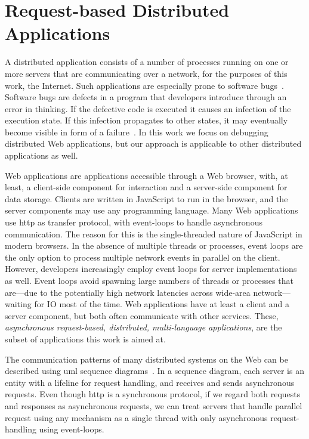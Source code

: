 \chapter{Request-based Distributed Applications}
\label{sec:requ-based-distr}

A distributed application consists of a number of processes running on
one or more servers that are communicating over a network, for the
purposes of this work, the Internet. Such applications are especially
prone to software bugs~\cite{Ballou2008}. Software bugs are defects in
a program that developers introduce through an error in thinking. If
the defective code is executed it causes an infection of the execution
state. If this infection propagates to other states, it may eventually
become visible in form of a failure~\cite{zeller2009programs}. In this
work we focus on debugging distributed Web applications, but our
approach is applicable to other distributed applications as well.

Web applications are applications accessible through a Web browser,
with, at least, a client-side component for interaction and a
server-side component for data storage. Clients are written in
JavaScript to run in the browser, and the server components may use
any programming language. Many Web applications use \ac{http} as
transfer protocol, with event-loops to handle asynchronous
communication. The reason for this is the single-threaded nature of
JavaScript in modern browsers. In the absence of multiple threads or
processes, event loops are the only option to process multiple network
events in parallel on the client. However, developers increasingly
employ event loops for server implementations as well. Event loops
avoid spawning large numbers of threads or processes that are---due to
the potentially high network latencies across wide-area
network---waiting for IO most of the time. Web applications have at
least a client and a server component, but both often communicate with
other services. These, \emph{asynchronous request-based, distributed,
multi-language applications}, are the subset of applications this work
is aimed at.

The communication patterns of many distributed systems on the Web can
be described using \ac{uml} sequence
diagrams~\cite{rumbaugh2004unified}. In a sequence diagram, each
server is an entity with a lifeline for request handling, and receives
and sends asynchronous requests. Even though \ac{http} is a
synchronous protocol, if we regard both requests and responses as
asynchronous requests, we can treat servers that handle parallel
request using any mechanism as a single thread with only asynchronous
request-handling using event-loops.

